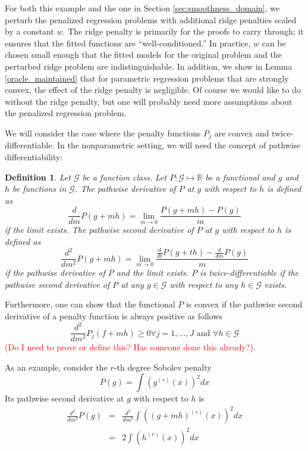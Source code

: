 \documentclass[12pt]{article}
\newtheorem{definition}{Definition}
\begin{document}
For both this example and the one in Section \ref{sec:smoothness_domain}, we perturb the penalized regression problems with additional ridge penalties scaled by a constant $w$. The ridge penalty is primarily for the proofs to carry through; it ensures that the fitted functions are ``well-conditioned.'' In practice, $w$ can be chosen small enough that the fitted models for the original problem and the perturbed ridge problem are indistinguishable. In addition, we show in Lemma \ref{oracle_maintained} that for parametric regression problems that are strongly convex, the effect of the ridge penalty is negligible. Of course we would like to do without the ridge penalty, but one will probably need more assumptions about the penalized regression problem.

We will consider the case where the penalty functions $P_j$ are convex and twice-differentiable. In the nonparametric setting, we will need the concept of pathwise differentiability:
\begin{definition}
	Let $\mathcal{G}$ be a function class.
	Let $P:\mathcal{G} \mapsto \mathbb{R}$ be a functional and $g$ and $h$ be functions in $\mathcal{G}$.
	The pathwise derivative of $P$ at $g$ with respect to $h$ is defined as
	$$
	\frac{d}{d m} P(g + mh) = \lim_{m \rightarrow 0} \frac{P(g + mh) - P(g)}{m}
	$$
	if the limit exists.
	The pathwise second derivative of $P$ at $g$ with respect to $h$ is defined as
	$$
	\frac{d^2}{d m^2} P(g + mh) = \lim_{m \rightarrow 0} \frac{\frac{d}{d t} P(g + th) - \frac{d}{d m} P(g)}{m}
	$$	
	if the pathwise derivative of $P$ and the limit exists.
	$P$ is twice-differentiable if the pathwise second derivative of $P$ at any $g \in \mathcal{G}$ with respect to any $h \in \mathcal{G}$ exists.
\end{definition}
Furthermore, one can show that the functional $P$ is convex if the pathwise second derivative of a penalty function is always positive as follows
\begin{equation}
\frac{d^2}{d m^2} P_j(f + mh) \ge 0 \forall j= 1,...,J \text{ and } \forall h \in \mathcal{G}
\end{equation}
\textcolor{red}{(Do I need to prove or define this? Has someone done this already?)}. 

As an example, consider the $r$-th degree Sobolev penalty
\begin{equation}
P(g) = \int \left(g^{(r)}(x) \right)^2 dx
\end{equation}
Its pathwise second derivative at $g$ with respect to $h$ is
\begin{eqnarray}
\frac{d^2}{dm^2} P(g) &=& \frac{d^2}{dm^2} \int \left((g + mh)^{(r)}(x) \right)^2 dx\\
&=& 2 \int \left(h^{(r)}(x) \right)^2 dx
\end{eqnarray}
\end{document}
